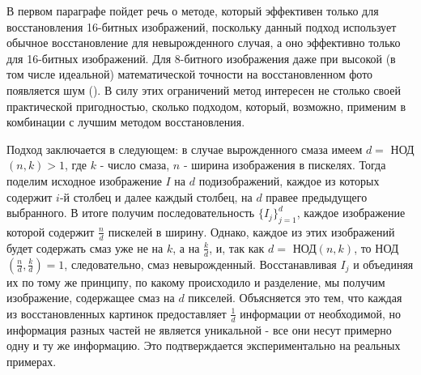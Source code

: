 \documentclass[a4paper]{article}
\theoremstyle{definition}
\begin{document}
    В первом параграфе пойдет речь о методе, который эффективен только для восстановления 16-битных изображений, поскольку данный подход использует обычное восстановление для невырожденного случая, а оно эффективно только для 16-битных изображений. Для 8-битного изображения даже при высокой (в том числе идеальной) математической точности на восстановленном фото появляется шум (\cite{noise}). В силу этих ограничений метод интересен не столько своей практической пригодностью, сколько подходом, который, возможно, применим в комбинации с лучшим методом восстановления.


    Подход заключается в следующем: в случае вырожденного смаза имеем $d =$ НОД$(n, k) > 1$, где $k$ - число смаза, $n$ - ширина изображения в пискелях. Тогда поделим исходное изображение $I$ на $d$ подизображений, каждое из которых содержит $i$-й столбец и далее каждый столбец, на $d$ правее предыдущего выбранного. В итоге получим последовательность $\{I_j\}_{j=1}^{d}$, каждое изображение которой содержит $\frac{n}{d}$ пискелей в ширину. Однако, каждое из этих изображений будет содержать смаз уже не на $k$, а на $\frac{k}{d}$, и, так как $d =$ НОД$(n, k)$, то НОД$(\frac{n}{d}, \frac{k}{d}) = 1$, следовательно, смаз невырожденный. Восстанавливая $I_j$ и объединяя их по тому же принципу, по какому происходило и разделение, мы получим изображение, содержащее смаз на $d$ пикселей. Объясняется это тем, что каждая из восстановленных картинок предоставляет $\frac{1}{d}$ информации от необходимой, но информация разных частей не является уникальной - все они несут примерно одну и ту же информацию. Это подтверждается экспериментально на реальных примерах.

\newpage
\end{document}
